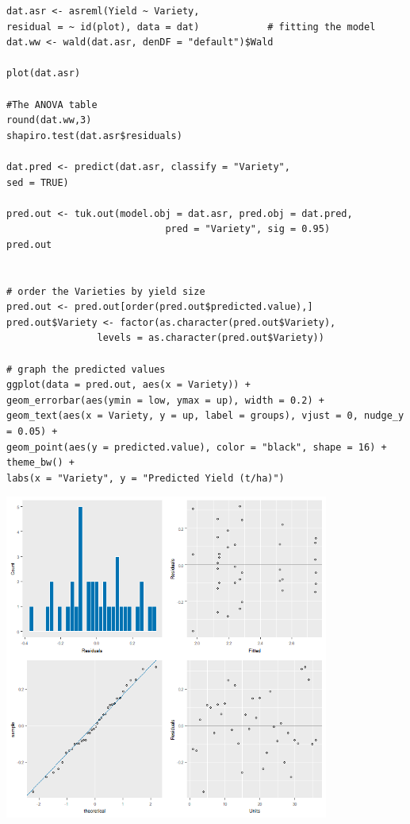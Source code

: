 \documentclass[a4paper, 10pt, fleqn, twosided]{memoir}
\begin{document}
\begin{tcolorbox}[title = Exercise 7 code]
\begin{verbatim}
dat.asr <- asreml(Yield ~ Variety,
residual = ~ id(plot), data = dat)            # fitting the model
dat.ww <- wald(dat.asr, denDF = "default")$Wald

plot(dat.asr)

#The ANOVA table
round(dat.ww,3)
shapiro.test(dat.asr$residuals)

dat.pred <- predict(dat.asr, classify = "Variety",
sed = TRUE)

pred.out <- tuk.out(model.obj = dat.asr, pred.obj = dat.pred,
                            pred = "Variety", sig = 0.95)
pred.out


# order the Varieties by yield size
pred.out <- pred.out[order(pred.out$predicted.value),]
pred.out$Variety <- factor(as.character(pred.out$Variety),
                levels = as.character(pred.out$Variety))
 
# graph the predicted values 
ggplot(data = pred.out, aes(x = Variety)) +
geom_errorbar(aes(ymin = low, ymax = up), width = 0.2) +
geom_text(aes(x = Variety, y = up, label = groups), vjust = 0, nudge_y = 0.05) +
geom_point(aes(y = predicted.value), color = "black", shape = 16) + theme_bw() +
labs(x = "Variety", y = "Predicted Yield (t/ha)")
\end{verbatim}
\end{tcolorbox}

\begin{tcolorbox}[title = Exercise 7 output]
\includegraphics[width=0.8\textwidth, frame]{Exercise7Resplot.png}
\end{tcolorbox}
\end{document}
